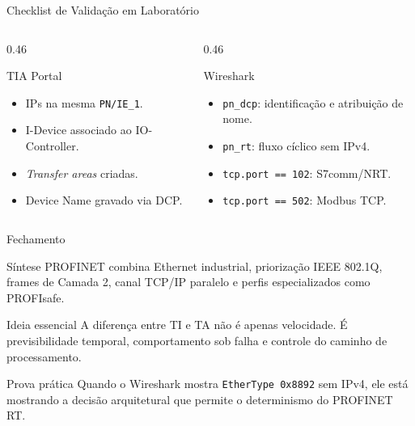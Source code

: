 \documentclass[10pt, aspectratio=169]{beamer}
\begin{document}
\begin{frame}{Checklist de Valida\c{c}\~ao em Laborat\'orio}
    \small
    \begin{columns}[T,totalwidth=\textwidth]
        \begin{column}{0.46\textwidth}
            \begin{block}{TIA Portal}
                \begin{itemize}
                    \item IPs na mesma \texttt{PN/IE\_1}.
                    \item I-Device associado ao IO-Controller.
                    \item \textit{Transfer areas} criadas.
                    \item Device Name gravado via DCP.
                \end{itemize}
            \end{block}
        \end{column}
        \begin{column}{0.46\textwidth}
            \begin{block}{Wireshark}
                \begin{itemize}
                    \item \texttt{pn\_dcp}: identifica\c{c}\~ao e atribui\c{c}\~ao de nome.
                    \item \texttt{pn\_rt}: fluxo c\'iclico sem IPv4.
                    \item \texttt{tcp.port == 102}: S7comm/NRT.
                    \item \texttt{tcp.port == 502}: Modbus TCP.
                \end{itemize}
            \end{block}
        \end{column}
    \end{columns}
\end{frame}

\begin{frame}{Fechamento}
    \small
    \begin{block}{S\'intese}
        PROFINET combina Ethernet industrial, prioriza\c{c}\~ao IEEE 802.1Q, frames de Camada 2, canal TCP/IP paralelo e perfis especializados como PROFIsafe.
    \end{block}

    \begin{block}{Ideia essencial}
        A diferen\c{c}a entre TI e TA n\~ao \'e apenas velocidade. \'E previsibilidade temporal, comportamento sob falha e controle do caminho de processamento.
    \end{block}

    \begin{block}{Prova pr\'atica}
        Quando o Wireshark mostra \texttt{EtherType 0x8892} sem IPv4, ele est\'a mostrando a decis\~ao arquitetural que permite o \alert{determinismo} do PROFINET RT.
    \end{block}
\end{frame}
\end{document}
